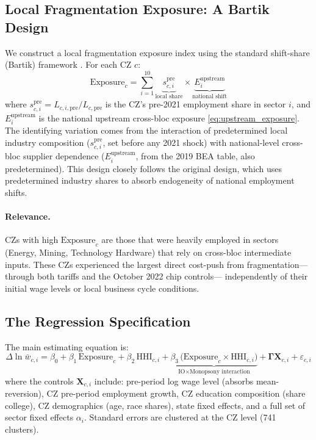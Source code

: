 \subsection{Local Fragmentation Exposure: A Bartik Design}
\label{sec:bartik}

We construct a local fragmentation exposure index using the standard
shift-share (Bartik) framework \citep{goldsmith2020bartik}. For each CZ $c$:
\begin{equation}
  \text{Exposure}_c = \sum_{i=1}^{10} \underbrace{s_{c,i}^{\text{pre}}}_{\text{local share}}
  \times \underbrace{E_i^{\text{upstream}}}_{\text{national shift}}
  \label{eq:bartik}
\end{equation}
where $s_{c,i}^{\text{pre}} = L_{c,i,\text{pre}}/L_{c,\text{pre}}$ is the
CZ's pre-2021 employment share in sector $i$, and $E_i^{\text{upstream}}$
is the national upstream cross-bloc exposure \eqref{eq:upstream_exposure}.
The identifying variation comes from the interaction of predetermined local
industry composition ($s_{c,i}^{\text{pre}}$, set before any 2021 shock) with
national-level cross-bloc supplier dependence ($E_i^{\text{upstream}}$, from
the 2019 BEA table, also predetermined). This design closely follows the
original \citet{autor2013china} design, which uses predetermined industry
shares to absorb endogeneity of national employment shifts.

\paragraph{Relevance.}
CZs with high $\text{Exposure}_c$ are those that were heavily employed in
sectors (Energy, Mining, Technology Hardware) that rely on cross-bloc
intermediate inputs. These CZs experienced the largest direct cost-push from
fragmentation---through both tariffs and the October 2022 chip controls---
independently of their initial wage levels or local business cycle conditions.

\subsection{The Regression Specification}
\label{sec:specification}

The main estimating equation is:
\begin{equation}
  \Delta\ln\bar{w}_{c,i} = \beta_0 + \beta_1\,\text{Exposure}_c +
  \beta_2\,\text{HHI}_{c,i} +
  \underbrace{\beta_3\,\bigl(\text{Exposure}_c \times \text{HHI}_{c,i}\bigr)}_{\text{IO}\times\text{Monopsony interaction}} +
  \boldsymbol\Gamma\mathbf{X}_{c,i} + \varepsilon_{c,i}
  \label{eq:main_regression}
\end{equation}
where the controls $\mathbf{X}_{c,i}$ include: pre-period log wage level
(absorbs mean-reversion), CZ pre-period employment growth, CZ education
composition (share college), CZ demographics (age, race shares), state fixed
effects, and a full set of sector fixed effects $\alpha_i$. Standard errors
are clustered at the CZ level (741 clusters).

